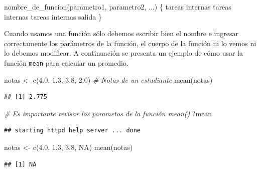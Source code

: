 \documentclass[
]{book}
\newenvironment{Shaded}{\begin{snugshade}}{\end{snugshade}}
\newcommand{\CommentTok}[1]{\textcolor[rgb]{0.56,0.35,0.01}{\textit{#1}}}
\newcommand{\ConstantTok}[1]{\textcolor[rgb]{0.00,0.00,0.00}{#1}}
\newcommand{\FloatTok}[1]{\textcolor[rgb]{0.00,0.00,0.81}{#1}}
\newcommand{\FunctionTok}[1]{\textcolor[rgb]{0.00,0.00,0.00}{#1}}
\newcommand{\NormalTok}[1]{#1}
\newcommand{\OtherTok}[1]{\textcolor[rgb]{0.56,0.35,0.01}{#1}}
\begin{document}
\begin{Shaded}
\begin{Highlighting}[]
\FunctionTok{nombre\_de\_funcion}\NormalTok{(parametro1, parametro2, ...) \{}
\NormalTok{  tareas internas}
\NormalTok{  tareas internas}
\NormalTok{  tareas internas}
\NormalTok{  salida}
\NormalTok{\}}
\end{Highlighting}
\end{Shaded}

Cuando usamos una función sólo debemos escribir bien el nombre e ingresar correctamente los parámetros de la función, el cuerpo de la función ni lo vemos ni lo debemos modificar. A continuación se presenta un ejemplo de cómo usar la función \texttt{mean} para calcular un promedio.

\begin{Shaded}
\begin{Highlighting}[]
\NormalTok{notas }\OtherTok{\textless{}{-}} \FunctionTok{c}\NormalTok{(}\FloatTok{4.0}\NormalTok{, }\FloatTok{1.3}\NormalTok{, }\FloatTok{3.8}\NormalTok{, }\FloatTok{2.0}\NormalTok{)  }\CommentTok{\# Notas de un estudiante}
\FunctionTok{mean}\NormalTok{(notas)}
\end{Highlighting}
\end{Shaded}

\begin{verbatim}
## [1] 2.775
\end{verbatim}

\begin{Shaded}
\begin{Highlighting}[]
\CommentTok{\# Es importante revisar los parametos de la función mean()}
\NormalTok{?mean}
\end{Highlighting}
\end{Shaded}

\begin{verbatim}
## starting httpd help server ... done
\end{verbatim}

\begin{Shaded}
\begin{Highlighting}[]
\NormalTok{notas }\OtherTok{\textless{}{-}} \FunctionTok{c}\NormalTok{(}\FloatTok{4.0}\NormalTok{, }\FloatTok{1.3}\NormalTok{, }\FloatTok{3.8}\NormalTok{, }\ConstantTok{NA}\NormalTok{) }
\FunctionTok{mean}\NormalTok{(notas)}
\end{Highlighting}
\end{Shaded}

\begin{verbatim}
## [1] NA
\end{verbatim}
\end{document}
